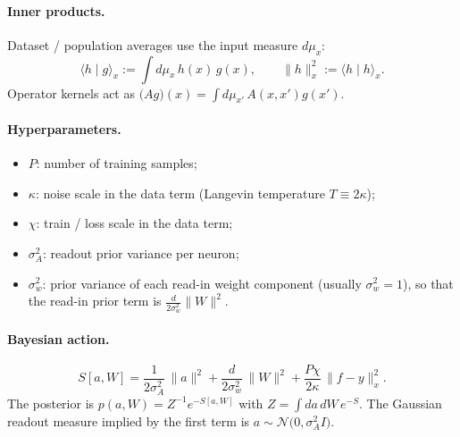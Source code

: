 \documentclass[11pt,a4paper]{article}
\begin{document}
\paragraph{Inner products.}
Dataset / population averages use the input measure $d\mu_x$:
\begin{equation}
  \langle h\mid g\rangle_x
  :=
  \int d\mu_x\, h(x)\,g(x),
  \qquad
  \lVert h\rVert_x^2
  :=
  \langle h\mid h\rangle_x.
\end{equation}
Operator kernels act as
$\bigl(Ag\bigr)(x)=\int d\mu_{x'}\,A(x,x')g(x')$.

\paragraph{Hyperparameters.}
\begin{itemize}
  \item $P$: number of training samples;
  \item $\kappa$: noise scale in the data term (Langevin temperature $T\equiv 2\kappa$);
  \item $\chi$: train / loss scale in the data term;
  \item $\sigma_A^2$: readout prior variance per neuron;
  \item $\sigma_w^2$: prior variance of each read-in weight component
        (usually $\sigma_w^2=1$), so that the read-in prior term is
        $\frac{d}{2\sigma_w^2}\lVert W\rVert^2$.
\end{itemize}

\paragraph{Bayesian action.}
\begin{equation}
  S[a,W]
  =
  \frac{1}{2\sigma_A^2}\,\lVert a\rVert^2
  +
  \frac{d}{2\sigma_w^2}\,\lVert W\rVert^2
  +
  \frac{P\chi}{2\kappa}\,
  \bigl\lVert f-y\bigr\rVert_x^2.
  \label{eq:S-weights}
\end{equation}
The posterior is
$p(a,W)=Z^{-1}e^{-S[a,W]}$ with $Z=\int da\,dW\,e^{-S}$.
The Gaussian readout measure implied by the first term is
$a\sim\mathcal{N}\!\bigl(0,\sigma_A^2 I\bigr)$.
\end{document}
